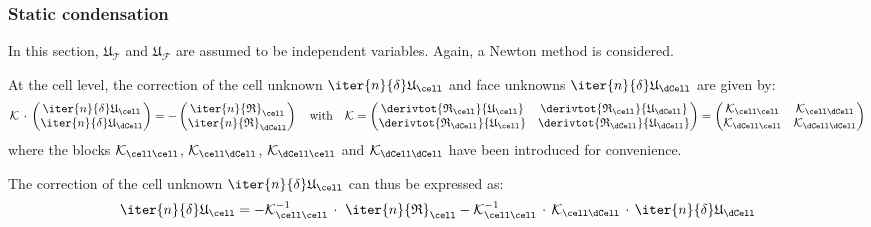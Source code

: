 \subsubsection{Static condensation}

In this section, $\mathfrak{U}_{\mathcal{T}}$ and
$\mathfrak{U}_{\mathcal{F}}$ are assumed to be independent variables.
Again, a Newton method is considered.

At the cell level, the correction of the cell unknown
$\iter{n}{\delta}\mathfrak{U}_{\cell}$ and face unknowns
$\iter{n}{\delta}\mathfrak{U}_{\dCell}$ are given by:
\begin{equation}
\label{eq_static_condensation_final}
\mathcal{K}\,\cdot\,
\begin{pmatrix}
  \iter{n}{\delta}\mathfrak{U}_{\cell}
  \\
  \iter{n}{\delta}\mathfrak{U}_{\dCell}
\end{pmatrix}
= -
\begin{pmatrix}
  \iter{n}{\mathfrak{R}}_{\mathcal{\cell}}
  \\
  \iter{n}{\mathfrak{R}}_{\mathcal{\dCell}}
\end{pmatrix}
\quad\text{with}\quad \mathcal{K} =
\begin{pmatrix}
  \derivtot{\mathfrak{R}_{\cell}}{\mathfrak{U}_{\cell}}
  & \derivtot{\mathfrak{R}_{\cell}}{\mathfrak{U}_{\dCell}} \\
  \derivtot{\mathfrak{R}_{\dCell}}{\mathfrak{U}_{\cell}}
  & \derivtot{\mathfrak{R}_{\dCell}}{\mathfrak{U}_{\dCell}} \\
\end{pmatrix}
=
\begin{pmatrix}
  \mathcal{K}_{\cell\cell} &
  \mathcal{K}_{\cell\dCell} \\
  \mathcal{K}_{\dCell\cell} &
  \mathcal{K}_{\dCell\dCell} \\
\end{pmatrix}
\end{equation}
where the blocks \(\mathcal{K}_{\cell\cell}\),
\(\mathcal{K}_{\cell\dCell}\), \(\mathcal{K}_{\dCell\cell}\) and
\(\mathcal{K}_{\dCell\dCell}\) have been introduced for convenience.

The correction of the cell unknown
$\iter{n}{\delta}\mathfrak{U}_{\cell}$ can thus be expressed as:
\begin{equation}
  \label{eq:cell_unknown_correction}
  \iter{n}{\delta}\mathfrak{U}_{\cell}=
  -\mathcal{K}_{\cell\cell}^{-1}\,\cdot\,\,\iter{n}{\mathfrak{R}}_{\mathcal{\cell}}
  -\mathcal{K}_{\cell\cell}^{-1}\,\cdot\,\mathcal{K}_{\cell\dCell}\,\cdot\,\iter{n}{\delta}\mathfrak{U}_{\dCell}
\end{equation}

